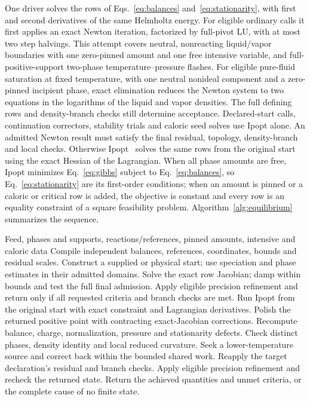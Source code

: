 One driver solves the rows of Eqs.~\eqref{eq:balances} and~\eqref{eq:stationarity}, with first and second derivatives of the same Helmholtz energy.
For eligible ordinary calls it first applies an exact Newton iteration, factorized by full-pivot LU, with at most two step halvings.
This attempt covers neutral, nonreacting liquid/vapor boundaries with one zero-pinned amount and one free intensive variable, and full-positive-support two-phase temperature--pressure flashes.
For eligible pure-fluid saturation at fixed temperature, with one neutral nonideal component and a zero-pinned incipient phase, exact elimination reduces the Newton system to two equations in the logarithms of the liquid and vapor densities.
The full defining rows and density-branch checks still determine acceptance.
Declared-start calls, continuation correctors, stability trials and caloric seed solves use Ipopt alone.
An admitted Newton result must satisfy the final residual, topology, density-branch and local checks.
Otherwise Ipopt~\citep{Wachter2006} solves the same rows from the original start using the exact Hessian of the Lagrangian.
When all phase amounts are free, Ipopt minimizes Eq.~\eqref{eq:gibbs} subject to Eq.~\eqref{eq:balances}, so Eq.~\eqref{eq:stationarity} are its first-order conditions; when an amount is pinned or a caloric or critical row is added, the objective is constant and every row is an equality constraint of a square feasibility problem.
Algorithm~\ref{alg:equilibrium} summarizes the sequence.

\begin{algorithm}[tbp]
\caption{A declared phase and reaction equilibrium}
\label{alg:equilibrium}
\begin{algorithmic}[1]
\Require Feed, phases and supports, reactions/references, pinned amounts, intensive and caloric data
\State Compile independent balances, references, coordinates, bounds and residual scales.
\State Construct a supplied or physical start; use speciation and phase estimates in their admitted domains.
\State Solve the exact row Jacobian; damp within bounds and test the full final admission.
\State Apply eligible precision refinement and return only if all requested criteria and branch checks are met.
\EndIf
\State Run Ipopt from the original start with exact constraint and Lagrangian derivatives.
\State Polish the returned positive point with contracting exact-Jacobian corrections.
\State Recompute balance, charge, normalization, pressure and stationarity defects.
\State Check distinct phases, density identity and local reduced curvature.
\State Seek a lower-temperature source and correct back within the bounded shared work.
\State Reapply the target declaration's residual and branch checks.
\EndIf
\State Apply eligible precision refinement and recheck the returned state.
\State Return the achieved quantities and unmet criteria, or the complete cause of no finite state.
\end{algorithmic}
\end{algorithm}

